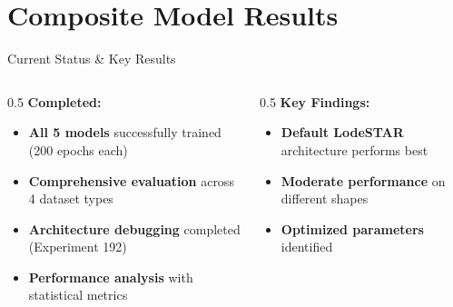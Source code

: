 \section[Composite Model Results]{Composite Model Results}

\begin{frame}{Current Status \& Key Results}
\begin{columns}
\begin{column}{0.5\textwidth}
\textbf{Completed:}
\begin{itemize}
    \item \textbf{All 5 models} successfully trained (200 epochs each)
    \item \textbf{Comprehensive evaluation} across 4 dataset types
    \item \textbf{Architecture debugging} completed (Experiment 192)
    \item \textbf{Performance analysis} with statistical metrics
\end{itemize}
\end{column}
\begin{column}{0.5\textwidth}
\textbf{Key Findings:}
\begin{itemize}
    \item \textbf{Default LodeSTAR} architecture performs best
    \item \textbf{Moderate performance} on different shapes
    \item \textbf{Optimized parameters} identified
\end{itemize}
\end{column}
\end{columns}
\end{frame}

